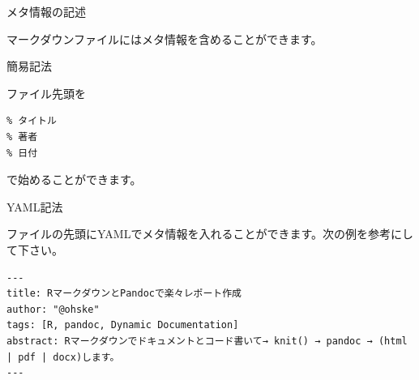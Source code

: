 \begin{frame}[fragile]{メタ情報の記述}

マークダウンファイルにはメタ情報を含めることができます。

\begin{block}{簡易記法}

ファイル先頭を

\begin{verbatim}
% タイトル
% 著者
% 日付
\end{verbatim}

で始めることができます。

\end{block}

\begin{block}{YAML記法}

ファイルの先頭にYAMLでメタ情報を入れることができます。次の例を参考にして下さい。

\begin{verbatim}
---
title: RマークダウンとPandocで楽々レポート作成
author: "@ohske"
tags: [R, pandoc, Dynamic Documentation]
abstract: Rマークダウンでドキュメントとコード書いて→ knit() → pandoc → (html | pdf | docx)します。
---
\end{verbatim}

\end{block}

\end{frame}

